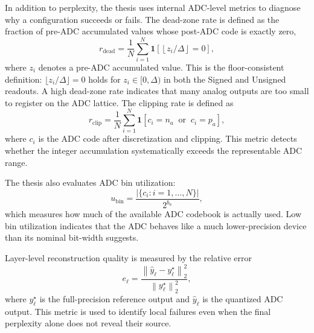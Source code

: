 \documentclass[a4paper,11pt,oneside]{article}
\theoremstyle{breakstyle}
\begin{document}
In addition to perplexity, the thesis uses internal ADC-level metrics to diagnose why a configuration succeeds or fails. The dead-zone rate is defined as the fraction of pre-ADC accumulated values whose post-ADC code is exactly zero,
\begin{equation}
    r_{\mathrm{dead}}
    =
    \frac{1}{N}
    \sum_{i=1}^{N}
    \mathbf{1}
    \left[
        \left\lfloor z_i / \Delta \right\rfloor = 0
    \right],
    \label{eq:dead_rate}
\end{equation}
where \(z_i\) denotes a pre-ADC accumulated value. This is the floor-consistent definition: $\lfloor z_i / \Delta\rfloor = 0$ holds for $z_i \in [0,\Delta)$ in both the Signed and Unsigned readouts. A high dead-zone rate indicates that many analog outputs are too small to register on the ADC lattice. The clipping rate is defined as
\begin{equation}
    r_{\mathrm{clip}}
    =
    \frac{1}{N}
    \sum_{i=1}^{N}
    \mathbf{1}
    \left[
        c_i = n_a
        \;\;\mathrm{or}\;\;
        c_i = p_a
    \right],
\end{equation}
where \(c_i\) is the ADC code after discretization and clipping. This metric detects whether the integer accumulation systematically exceeds the representable ADC range.

The thesis also evaluates ADC bin utilization:
\begin{equation}
    u_{\mathrm{bin}}
    =
    \frac{
        \left|
            \{c_i : i = 1,\ldots,N\}
        \right|
    }{
        2^{b_a}
    },
\end{equation}
which measures how much of the available ADC codebook is actually used. Low bin utilization indicates that the ADC behaves like a much lower-precision device than its nominal bit-width suggests.

Layer-level reconstruction quality is measured by the relative error
\begin{equation}
    e_\ell
    =
    \frac{
        \left\|
            \hat{y}_\ell
            -
            y^\star_\ell
        \right\|_2^2
    }{
        \left\|
            y^\star_\ell
        \right\|_2^2
    },
\end{equation}
where \(y^\star_\ell\) is the full-precision reference output and \(\hat{y}_\ell\) is the quantized ADC output. This metric is used to identify local failures even when the final perplexity alone does not reveal their source.
\end{document}
